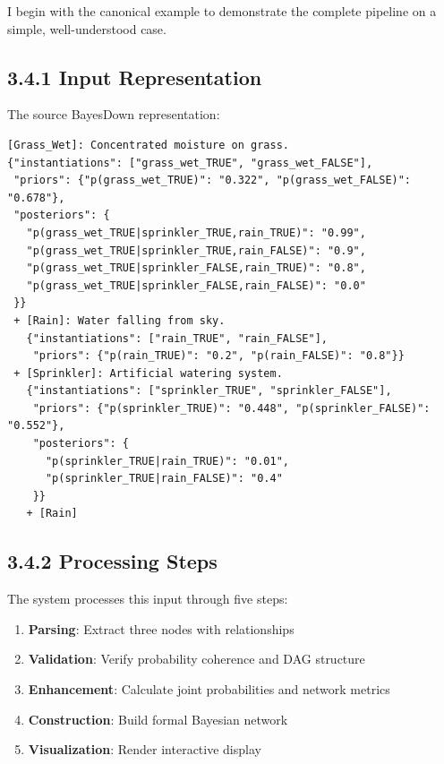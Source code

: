 \documentclass[
  11pt,
  letterpaper,
]{book}
\providecommand{\tightlist}{%
  \setlength{\itemsep}{0pt}\setlength{\parskip}{0pt}}
\begin{document}

I begin with the canonical example to demonstrate the complete pipeline
on a simple, well-understood case.

\subsection*{3.4.1 Input Representation}\label{sec-rsg-input}

The source BayesDown representation:

\begin{verbatim}
[Grass_Wet]: Concentrated moisture on grass.
{"instantiations": ["grass_wet_TRUE", "grass_wet_FALSE"],
 "priors": {"p(grass_wet_TRUE)": "0.322", "p(grass_wet_FALSE)": "0.678"},
 "posteriors": {
   "p(grass_wet_TRUE|sprinkler_TRUE,rain_TRUE)": "0.99",
   "p(grass_wet_TRUE|sprinkler_TRUE,rain_FALSE)": "0.9",
   "p(grass_wet_TRUE|sprinkler_FALSE,rain_TRUE)": "0.8",
   "p(grass_wet_TRUE|sprinkler_FALSE,rain_FALSE)": "0.0"
 }}
 + [Rain]: Water falling from sky.
   {"instantiations": ["rain_TRUE", "rain_FALSE"],
    "priors": {"p(rain_TRUE)": "0.2", "p(rain_FALSE)": "0.8"}}
 + [Sprinkler]: Artificial watering system.
   {"instantiations": ["sprinkler_TRUE", "sprinkler_FALSE"],
    "priors": {"p(sprinkler_TRUE)": "0.448", "p(sprinkler_FALSE)": "0.552"},
    "posteriors": {
      "p(sprinkler_TRUE|rain_TRUE)": "0.01",
      "p(sprinkler_TRUE|rain_FALSE)": "0.4"
    }}
   + [Rain]
\end{verbatim}

\subsection*{3.4.2 Processing Steps}\label{sec-rsg-processing}

The system processes this input through five steps:

\begin{enumerate}
\def\labelenumi{\arabic{enumi}.}
\tightlist
\item
  \textbf{Parsing}: Extract three nodes with relationships
\item
  \textbf{Validation}: Verify probability coherence and DAG structure
\item
  \textbf{Enhancement}: Calculate joint probabilities and network
  metrics
\item
  \textbf{Construction}: Build formal Bayesian network
\item
  \textbf{Visualization}: Render interactive display
\end{enumerate}
\end{document}
